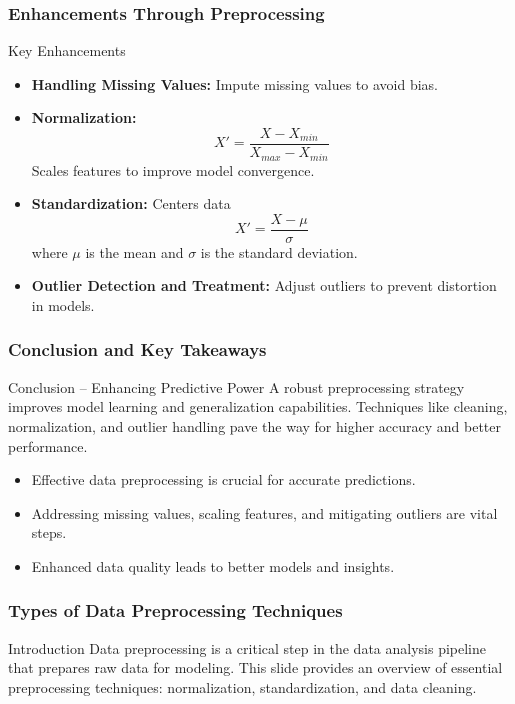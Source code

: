 \documentclass[aspectratio=169]{beamer}
\begin{document}
\begin{frame}[fragile]
    \frametitle{Enhancements Through Preprocessing}
    \begin{block}{Key Enhancements}
        \begin{itemize}
            \item \textbf{Handling Missing Values:} Impute missing values to avoid bias.
            \item \textbf{Normalization:}
                \begin{equation}
                X' = \frac{X - X_{min}}{X_{max} - X_{min}} 
                \end{equation}
                Scales features to improve model convergence.
            \item \textbf{Standardization:} Centers data
                \begin{equation}
                X' = \frac{X - \mu}{\sigma}
                \end{equation}
                where $\mu$ is the mean and $\sigma$ is the standard deviation.
            \item \textbf{Outlier Detection and Treatment:} Adjust outliers to prevent distortion in models.
        \end{itemize}
    \end{block}
\end{frame}

\begin{frame}[fragile]
    \frametitle{Conclusion and Key Takeaways}
    \begin{block}{Conclusion – Enhancing Predictive Power}
        A robust preprocessing strategy improves model learning and generalization capabilities. Techniques like cleaning, normalization, and outlier handling pave the way for higher accuracy and better performance.
    \end{block}
    
    \begin{itemize}
        \item Effective data preprocessing is crucial for accurate predictions.
        \item Addressing missing values, scaling features, and mitigating outliers are vital steps.
        \item Enhanced data quality leads to better models and insights.
    \end{itemize}
\end{frame}

\begin{frame}[fragile]
    \frametitle{Types of Data Preprocessing Techniques}
    \begin{block}{Introduction}
        Data preprocessing is a critical step in the data analysis pipeline that prepares raw data for modeling. This slide provides an overview of essential preprocessing techniques: normalization, standardization, and data cleaning.
    \end{block}
\end{frame}
\end{document}
